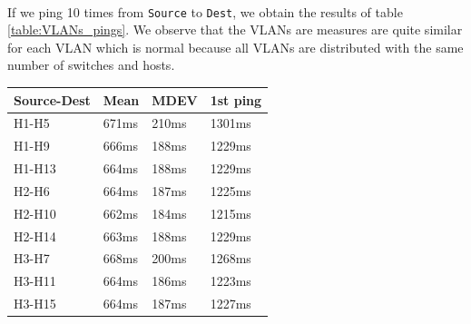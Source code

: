 \documentclass[a4paper, 11pt, oneside]{article}
\begin{document}
\paragraph{}If we ping 10 times from \texttt{Source} to \texttt{Dest}, we obtain the results of table \ref{table:VLANs_pings}. We observe that the VLANs are measures are quite similar for each VLAN which is normal because all VLANs are distributed with the same number of switches and hosts. 
\begin{table}[H]
    \centering
    \begin{tabular}{|l|l|l|l|}
    \hline
    \multicolumn{1}{|c|}{\textbf{Source-Dest}} & \multicolumn{1}{c|}{\textbf{Mean}} & \multicolumn{1}{c|}{\textbf{MDEV}} & \multicolumn{1}{c|}{\textbf{1st ping}} \\ \hline
    H1-H5                                      & 671ms                              & 210ms                              & 1301ms                                 \\ \hline
    H1-H9                                      & 666ms                              & 188ms                              & 1229ms                                 \\ \hline
    H1-H13                                      & 664ms                              & 188ms                              & 1229ms                                 \\ \hline
    H2-H6                                      & 664ms                              & 187ms                              & 1225ms                                 \\ \hline
    H2-H10                                      & 662ms                              & 184ms                              & 1215ms                                 \\ \hline
    H2-H14                                     & 663ms                              & 188ms                              & 1229ms                                 \\ \hline
    H3-H7                                      & 668ms                              & 200ms                              & 1268ms                                 \\ \hline
    H3-H11                                      & 664ms                              & 186ms                              & 1223ms                                 \\ \hline
    H3-H15                                      & 664ms                              & 187ms                              & 1227ms                                 \\ \hline

\end{tabular}
\end{table}
\end{document}
